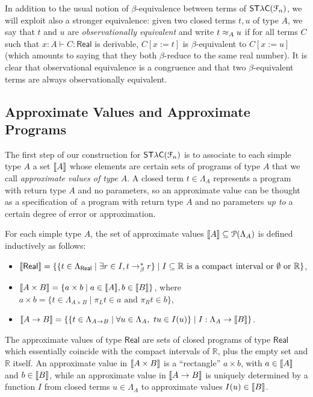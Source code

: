 In addition to the usual notion of $\beta$-equivalence between terms of $\mathsf{ST\lambda C}(\mathcal F_{n})$, we will exploit also a stronger equivalence: given two closed terms $t,u$ of type $A$,  we say that $t$ and $u$ are \emph{observationally equivalent} and write $t \approx_A u$ if for all terms $C$ such that $x:A \vdash C : \mathsf{Real}$ is derivable, $C[x:=t]$ is $\beta$-equivalent to $C[x:=u]$ (which amounts to saying that they both $\beta$-reduce to the same real number).  It is clear that observational equivalence is a congruence and that two $\beta$-equivalent terms are always observationally equivalent. %



\subsection{Approximate Values and Approximate Programs}

The first step of our construction for $\mathsf{ST\lambda C}(\mathcal F_{n})$ is to associate to each simple type $A$ a set $\llbracket A \rrbracket$ whose elements are certain sets of programs of type $A$ that we call \emph{approximate values of type $A$}. 
A closed term $t\in \Lambda_{A}$ represents a program with return type $A$ and no parameters, so an approximate value can be thought as a specification of a program with return type $A$ and no parameters \emph{up to} a certain degree of error or approximation.

For each simple type $A$, the set of approximate values $\llbracket A \rrbracket\subseteq \mathcal P(\Lambda_A)$ is defined inductively as follows:
\begin{itemize}
\item $\llbracket \mathsf{Real} \rrbracket = \{ \{ t \in \Lambda_\mathsf{Real} \mid \exists r \in I, t \to_\beta^* r \} \mid I \subseteq \mathbb{R} \text{ is a compact interval or $\emptyset$ or } \mathbb{R} \}$,
\item $\llbracket A \times B \rrbracket = \{ a \times b \mid a  \in \llbracket A \rrbracket, b \in \llbracket B \rrbracket \}$, where $a \times b = \{ t \in \Lambda_{A \times B} \mid \pi_L t \in a \text{ and } \pi_R t \in b \}$,
\item $\llbracket A \to B \rrbracket = \{ \{ t \in \Lambda_{A \to B} \mid \forall u \in \Lambda_{A},~ tu \in I(u) \} \mid I : \Lambda_A \to \llbracket B \rrbracket \}$.
\end{itemize}

The approximate values of type $\mathsf{Real}$ are sets of closed programs of type $\mathsf{Real}$ which essentially coincide with the compact intervals of $\mathbb R$, plus the empty set and $\mathbb{R}$ itself. An approximate value in $\llbracket A\times B \rrbracket$ is a ``rectangle'' $a \times b$, with $a\in \llbracket A \rrbracket$ and $b \in \llbracket B \rrbracket$, while an approximate value in $\llbracket A\to B \rrbracket$ is uniquely determined by a function 
$I$ from closed terms $u\in \Lambda_{ A}$ to approximate values $I(u)\in \llbracket B \rrbracket$.

